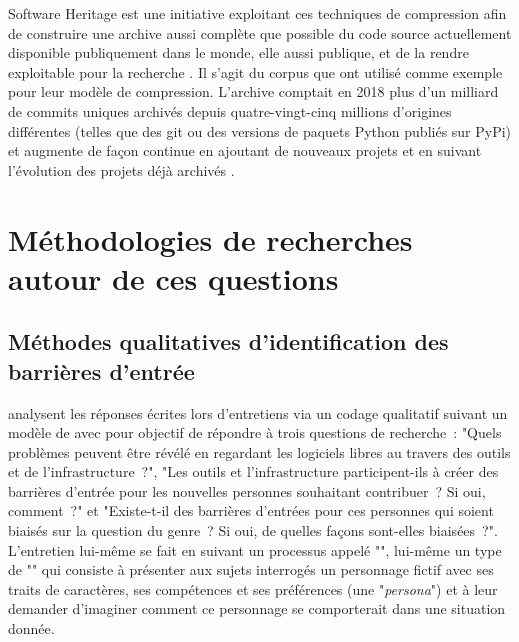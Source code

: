 Software Heritage est une initiative exploitant ces
techniques de compression afin de construire une archive aussi complète que possible du code source
actuellement disponible publiquement dans le monde, elle aussi publique, et de la rendre exploitable pour la
recherche . Il s'agit du corpus que \textcite{swh-graph-2020} ont utilisé comme
exemple pour leur modèle de compression. L'archive comptait en 2018 plus d'un milliard de \glspl{commit}
uniques archivés depuis quatre-vingt-cinq millions d'origines différentes (telles que des 
\gls{git} ou des versions de paquets Python publiés sur PyPi) et augmente de
façon continue en ajoutant de nouveaux projets et en suivant l'évolution des projets déjà archivés
.


\section{Méthodologies de recherches autour de ces questions}

\subsection{Méthodes qualitatives d'identification des barrières d'entrée}

\textcite[p.~1006]{barriers-2018} analysent les réponses écrites lors d'entretiens via un codage qualitatif
suivant un modèle de  avec pour objectif de répondre à trois questions de
recherche : "Quels problèmes peuvent être révélé en regardant les logiciels libres au travers des outils et de
l'infrastructure ?", "Les outils et l'infrastructure participent-ils à créer des barrières d'entrée pour les
nouvelles personnes souhaitant contribuer ? Si oui, comment ?" et "Existe-t-il des barrières d'entrées pour
ces personnes qui soient biaisés sur la question du genre ? Si oui, de quelles façons sont-elles biaisées ?".
L'entretien lui-même se fait en suivant un processus appelé "", lui-même un type de
"" qui consiste à présenter aux sujets interrogés un personnage fictif avec ses
traits de caractères, ses compétences et ses préférences (une "\emph{persona}") et à leur demander d'imaginer
comment ce personnage se comporterait dans une situation donnée.

